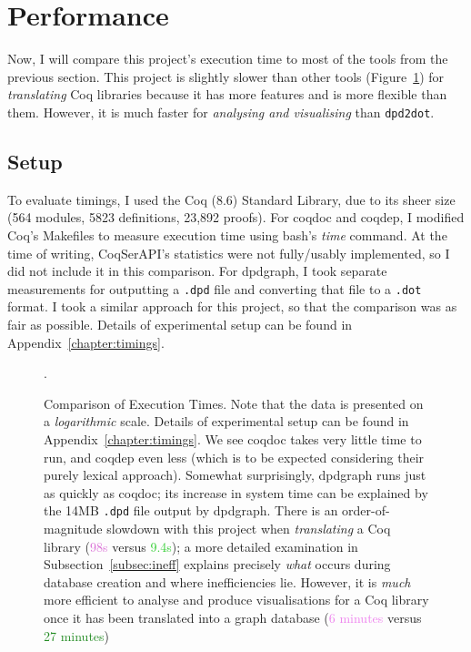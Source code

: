 \section{Performance}

Now, I will compare this project's execution time to most of the tools from the
previous section. This project is slightly slower than other tools
(Figure~\ref{fig:exectimes}) for \emph{translating} Coq libraries because it has
more features and is more flexible than them. However, it is much faster for
\emph{analysing and visualising} than \texttt{dpd2dot}.

\subsection{Setup}

To evaluate timings, I used the Coq (8.6) Standard Library, due to its sheer
size (564 modules, 5823 definitions, 23,892 proofs). For coqdoc and coqdep, I
modified Coq's Makefiles to measure execution time using bash's \emph{time}
command. At the time of writing, CoqSerAPI's statistics were not fully/usably
implemented, so I did not include it in this comparison. For dpdgraph, I took
separate measurements for outputting a \texttt{.dpd} file and converting that
file to a \texttt{.dot} format. I took a similar approach for this project, so
that the comparison was as fair as possible. Details of experimental setup can
be found in Appendix~\ref{chapter:timings}.

\begin{figure}[tp]
\centering


\caption{Comparison of Execution Times. Note that the data is presented on a
  \emph{logarithmic} scale. Details of experimental setup can be found in
  Appendix~\ref{chapter:timings}.  We see coqdoc takes very little time to run,
  and coqdep even less (which is to be expected considering their purely lexical
  approach). Somewhat surprisingly, dpdgraph runs just as quickly as coqdoc; its
  increase in system time can be explained by the 14MB \texttt{.dpd} file output
  by dpdgraph. There is an order-of-magnitude slowdown with this project when
  \emph{translating} a Coq library (\textcolor{Orchid}{98s} versus
  \textcolor{LimeGreen}{9.4s}); a more detailed examination in
  Subsection~\ref{subsec:ineff} explains precisely \emph{what} occurs during
  database creation and where inefficiencies lie. However, it is \emph{much}
  more efficient to analyse and produce visualisations for a Coq library once it
  has been translated into a graph database (\textcolor{violet}{6 minutes}
  versus \textcolor{ForestGreen}{27 minutes})}.\label{fig:exectimes}

\end{figure}

